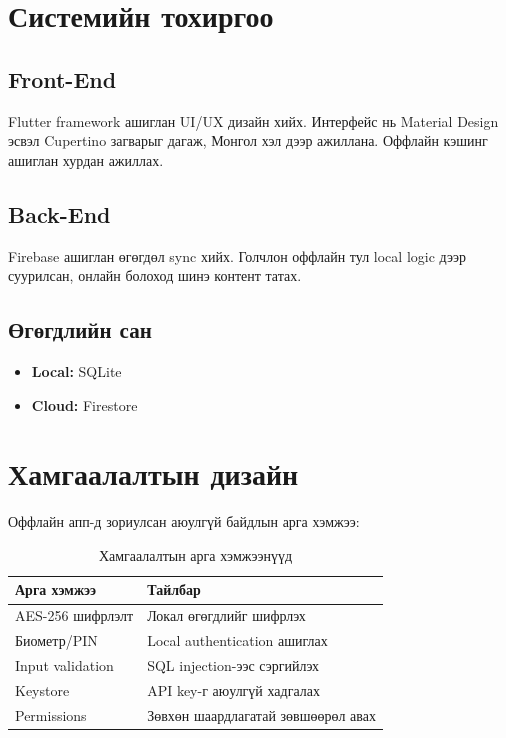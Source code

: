 \section{Системийн тохиргоо}

\subsection{Front-End}

Flutter framework ашиглан UI/UX дизайн хийх. Интерфейс нь Material Design эсвэл Cupertino загварыг дагаж, Монгол хэл дээр ажиллана. Оффлайн кэшинг ашиглан хурдан ажиллах.

\subsection{Back-End}

Firebase ашиглан өгөгдөл sync хийх. Голчлон оффлайн тул local logic дээр суурилсан, онлайн болоход шинэ контент татах.

\newpage
\subsection{Өгөгдлийн сан}

\begin{itemize}
	\item \textbf{Local:} SQLite
	\item \textbf{Cloud:} Firestore
\end{itemize}

\section{Хамгаалалтын дизайн}

Оффлайн апп-д зориулсан аюулгүй байдлын арга хэмжээ:

\begin{table}[htbp]
\centering
\begin{tabular}{|p{4cm}|p{9cm}|}
\hline
\textbf{Арга хэмжээ} & \textbf{Тайлбар} \\
\hline
AES-256 шифрлэлт & Локал өгөгдлийг шифрлэх \\
\hline
Биометр/PIN & Local authentication ашиглах \\
\hline
Input validation & SQL injection-ээс сэргийлэх \\
\hline
Keystore & API key-г аюулгүй хадгалах \\
\hline
Permissions & Зөвхөн шаардлагатай зөвшөөрөл авах \\
\hline
\end{tabular}
\caption{Хамгаалалтын арга хэмжээнүүд}
\label{tab:security}
\end{table}

